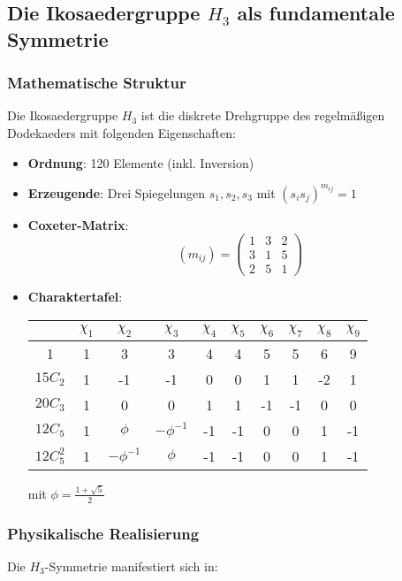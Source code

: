 \subsection{Die Ikosaedergruppe $H_3$ als fundamentale Symmetrie}
\label{subsec:h3_symmetry}

\subsubsection{Mathematische Struktur}
Die Ikosaedergruppe $H_3$ ist die diskrete Drehgruppe des regelmäßigen Dodekaeders mit folgenden Eigenschaften:

\begin{itemize}
    \item \textbf{Ordnung}: 120 Elemente (inkl. Inversion)
    \item \textbf{Erzeugende}: Drei Spiegelungen $s_1, s_2, s_3$ mit $(s_is_j)^{m_{ij}} = 1$
    \item \textbf{Coxeter-Matrix}:
    \[
    (m_{ij}) = \begin{pmatrix}
    1 & 3 & 2 \\
    3 & 1 & 5 \\
    2 & 5 & 1
    \end{pmatrix}
    \]
    \item \textbf{Charaktertafel}:
    
    \begin{tabular}{c|ccccccccc}
    & $\chi_1$ & $\chi_2$ & $\chi_3$ & $\chi_4$ & $\chi_5$ & $\chi_6$ & $\chi_7$ & $\chi_8$ & $\chi_9$ \\
    \hline
    1 & 1 & 3 & 3 & 4 & 4 & 5 & 5 & 6 & 9 \\
    $15C_2$ & 1 & -1 & -1 & 0 & 0 & 1 & 1 & -2 & 1 \\
    $20C_3$ & 1 & 0 & 0 & 1 & 1 & -1 & -1 & 0 & 0 \\
    $12C_5$ & 1 & $\phi$ & $-\phi^{-1}$ & -1 & -1 & 0 & 0 & 1 & -1 \\
    $12C_5^2$ & 1 & $-\phi^{-1}$ & $\phi$ & -1 & -1 & 0 & 0 & 1 & -1 \\
    \end{tabular}
    mit $\phi = \frac{1+\sqrt{5}}{2}$
\end{itemize}

\subsubsection{Physikalische Realisierung}
Die $H_3$-Symmetrie manifestiert sich in:

